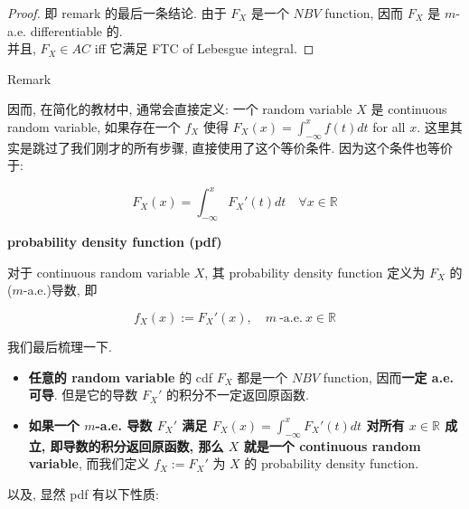 \documentclass{qlnotes-export}
\begin{document}
\begin{proof}

即 remark 的最后一条结论. 由于 \(F_{X}\) 是一个 \(NBV\) function, 因而 \(F_{X}\) 是 \(m\)-a.e. differentiable 的.\\
并且, \(F_{X} \in AC\) iff 它满足 FTC of Lebesgue integral.

\end{proof}

\begin{qlremark}{Remark}

因而, 在简化的教材中, 通常会直接定义: 一个 random variable \(X\) 是 continuous random variable, 如果存在一个 \(f_{X}\) 使得 \(F_{X}(x) = \int_{- \infty}^{x}f(t) dt\) for all \(x\). 这里其实是跳过了我们刚才的所有步骤, 直接使用了这个等价条件. 因为这个条件也等价于:

\[F_{X}(x) = \int_{- \infty}^{x}F_{X}'(t) dt\quad\forall x \in {\mathbb{R}}\]

\end{qlremark}

\begin{definition}{\protect{}\label{kn-probability-density-function-pdf}{\textbf{probability
density function (pdf)}}}

对于 continuous random variable \(X\), 其 probability density function 定义为 \(F_{X}\) 的 (\(m\)-a.e.)导数, 即

\[f_{X}(x) := F_{X}'(x),\quad m\ \text{-a.e.}\ x \in {\mathbb{R}}\]

\end{definition}

我们最后梳理一下.

\begin{itemize}
\item
  \textbf{任意的 random variable} 的 cdf \(F_{X}\) 都是一个 \(NBV\) function, 因而\textbf{一定 a.e. 可导}. 但是它的导数 \(F_{X}'\) 的积分不一定返回原函数.
\item
  \textbf{如果一个 \(m\)-a.e. 导数 \(F_{X}'\) 满足 \(F_{X}(x) = \int_{- \infty}^{x}F_{X}'(t) dt\) 对所有 \(x \in {\mathbb{R}}\) 成立, 即导数的积分返回原函数, 那么 \(X\) 就是一个 continuous random variable}, 而我们定义 \(f_{X} := F_{X}'\) 为 \(X\) 的 probability density function.
\end{itemize}

以及, 显然 pdf 有以下性质:
\end{document}
